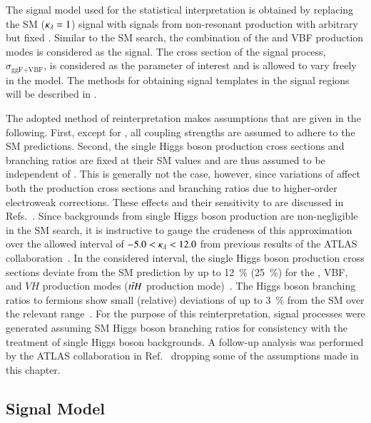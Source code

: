 The signal model used for the statistical interpretation is obtained
by replacing the SM \HH ($\kappa_{\lambda} = 1$) signal with signals from
non-resonant \HH production with arbitrary but fixed \klambda. Similar
to the SM \HH search, the combination of the \ggF and VBF production
modes is considered as the signal. The cross section of the signal
process, $\sigma_{\text{ggF+VBF}}$, is considered as the parameter of
interest and is allowed to vary freely in the model. The methods for
obtaining signal templates in the signal regions will be described in
.

The adopted method of reinterpretation makes assumptions that are
given in the following. First, except for \klambda, all coupling
strengths are assumed to adhere to the SM predictions. Second, the
single Higgs boson production cross sections and branching ratios are
fixed at their SM values and are thus assumed to be independent of
\klambda. This is generally not the case, however, since variations of
\klambda affect both the production cross sections and branching
ratios due to higher-order electroweak corrections. These effects and
their sensitivity to \klambda are discussed in
Refs.~\cite{ATL-PHYS-PUB-2019-009,Degrassi:2016wml,Maltoni:2017ims}.
Since backgrounds from single Higgs boson production are
non-negligible in the SM \HH search, it is instructive to gauge the
crudeness of this approximation over the allowed interval of
$-5.0 < \kappa_{\lambda} < 12.0$ from previous results of the ATLAS
collaboration~\cite{HDBS-2018-58}. In the considered \klambda
interval, the single Higgs boson production cross sections deviate
from the SM prediction by up to \SI{12}{\percent} (\SI{25}{\percent})
for the \ggF, VBF, and $VH$ production modes ($t\bar{t} H$ production
mode)~\cite{ATL-PHYS-PUB-2019-009}. The Higgs boson branching ratios
to fermions show small (relative) deviations of up to \SI{3}{\percent}
from the SM over the relevant \klambda
range~\cite{ATL-PHYS-PUB-2019-009}. For the purpose of this
reinterpretation, signal processes were generated assuming SM Higgs
boson branching ratios for consistency with the treatment of single
Higgs boson backgrounds. A follow-up analysis was performed by the
ATLAS collaboration in Ref.~\cite{ATL-HDBS-2022-03-002} dropping some
of the assumptions made in this chapter.


\subsection{Signal Model}%
\label{sec:self_coupling_signals}

